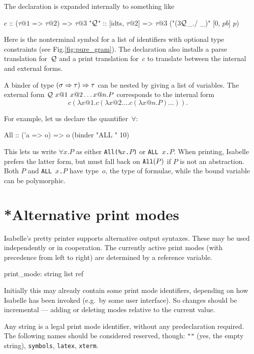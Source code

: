 The declaration is expanded internally to something like
\begin{ttbox}
\(c\)\hskip3pt    :: (\(\tau@1\) => \(\tau@2\)) => \(\tau@3\)
"\({\cal Q}\)"  :: [idts, \(\tau@2\)] => \(\tau@3\)   ("(3\({\cal Q}\)_./ _)" [0, \(pb\)] \(p\))
\end{ttbox}
Here  is the nonterminal symbol for a list of identifiers with
optional type constraints (see Fig.\ts\ref{fig:pure_gram}).  The
declaration also installs a parse translation
for~${\cal Q}$ and a print translation for~$c$ to
translate between the internal and external forms.

A binder of type $(\sigma \Rightarrow \tau) \Rightarrow \tau$ can be nested by giving a
list of variables.  The external form ${\cal Q}~x@1~x@2 \ldots x@n. P$
corresponds to the internal form
\[ c(\lambda x@1. c(\lambda x@2. \ldots c(\lambda x@n. P) \ldots)). \]

\medskip
For example, let us declare the quantifier~$\forall$:
\begin{ttbox}
All :: ('a => o) => o   (binder "ALL " 10)
\end{ttbox}
This lets us write $\forall x.P$ as either {\tt All(\%$x$.$P$)} or {\tt ALL
  $x$.$P$}.  When printing, Isabelle prefers the latter form, but must fall
back on ${\tt All}(P)$ if $P$ is not an abstraction.  Both $P$ and {\tt ALL
  $x$.$P$} have type~$o$, the type of formulae, while the bound variable
can be polymorphic.
\endgroup



\section{*Alternative print modes} \label{sec:prmodes}
%
Isabelle's pretty printer supports alternative output syntaxes.  These
may be used independently or in cooperation.  The currently active
print modes (with precedence from left to right) are determined by a
reference variable.
\begin{ttbox}
print_mode: string list ref
\end{ttbox}
Initially this may already contain some print mode identifiers,
depending on how Isabelle has been invoked (e.g.\ by some user
interface).  So changes should be incremental --- adding or deleting
modes relative to the current value.

Any \ML{} string is a legal print mode identifier, without any
predeclaration required.  The following names should be considered
reserved, though: \texttt{""} (yes, the empty string),
\texttt{symbols}, \texttt{latex}, \texttt{xterm}.

